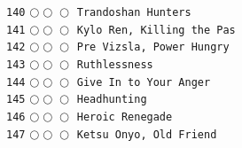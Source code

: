 \documentclass[a4paper,landscape]{article}
\begin{document}
\begin{multicols*}{5}
\texttt{140} \(\bigcirc\!\bigcirc\!\bigcirc\)  \texttt{Trandoshan Hunters} \vspace{-0.3mm}\\ 
\texttt{141} \(\bigcirc\!\bigcirc\!\bigcirc\)  \texttt{Kylo Ren, Killing the Pas} \vspace{-0.3mm}\\ 
\texttt{142} \(\bigcirc\!\bigcirc\!\bigcirc\)  \texttt{Pre Vizsla, Power Hungry} \vspace{-0.3mm}\\ 
\texttt{143} \(\bigcirc\!\bigcirc\!\bigcirc\)  \texttt{Ruthlessness} \vspace{-0.3mm}\\ 
\texttt{144} \(\bigcirc\!\bigcirc\!\bigcirc\)  \texttt{Give In to Your Anger} \vspace{-0.3mm}\\ 
\texttt{145} \(\bigcirc\!\bigcirc\!\bigcirc\)  \texttt{Headhunting} \vspace{-0.3mm}\\ 
\texttt{146} \(\bigcirc\!\bigcirc\!\bigcirc\)  \texttt{Heroic Renegade} \vspace{-0.3mm}\\ 
\texttt{147} \(\bigcirc\!\bigcirc\!\bigcirc\)  \texttt{Ketsu Onyo, Old Friend} \vspace{-0.3mm}\\ 

\end{multicols*}
\end{document}
